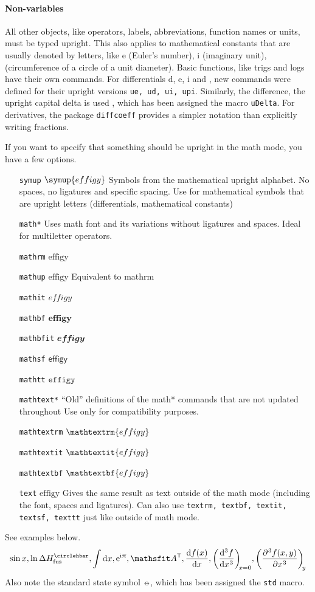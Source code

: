 \documentclass{article}
\begin{document}
\paragraph{Non-variables} All other objects, like operators, labels, abbreviations, function names or units, must be typed upright. This also applies to mathematical constants that are usually denoted by letters, like e (Euler's number), i (imaginary unit), \upi (circumference of a circle of a unit diameter). Basic functions, like trigs and logs have their own commands. For differentials d, e, i and \upi, new commands were defined for their upright versions \texttt{ue, ud, ui, upi}. Similarly, the difference, the upright capital delta is used \uDelta, which has been assigned the macro \texttt{uDelta}. For derivatives, the package \texttt{diffcoeff} provides a simpler notation than explicitly writing fractions.

If you want to specify that something should be upright in the math mode, you have a few options.
\begin{itemize}[leftmargin=10em]
    \item[\texttt{symup} \(\symup{effigy}\)] Symbols from the mathematical upright alphabet. No spaces, no ligatures and specific spacing. Use for mathematical symbols that are upright letters (differentials, mathematical constants)
    \item[\texttt{math*}] Uses math font and its variations without ligatures and spaces. Ideal for multiletter operators.
    \item[\texttt{mathrm} \(\mathrm{effigy}\)]
    \item[\texttt{mathup} \(\mathup{effigy}\)] Equivalent to mathrm
    \item[\texttt{mathit} \(\mathit{effigy}\)]
    \item[\texttt{mathbf} \(\mathbf{effigy}\)]
    \item[\texttt{mathbfit} \(\mathbfit{effigy}\)]
    \item[\texttt{mathsf} \(\mathsf{effigy}\)]
    \item[\texttt{mathtt} \(\mathtt{effigy}\)]
    \item[\texttt{mathtext*}] ``Old'' definitions of the math* commands that are not updated throughout  Use only for compatibility purposes.
    \item[\texttt{mathtextrm} \(\mathtextrm{effigy}\)]
    \item[\texttt{mathtextit} \(\mathtextit{effigy}\)]
    \item[\texttt{mathtextbf} \(\mathtextbf{effigy}\)]
    \item[\texttt{text} \(\text{effigy}\)] Gives the same result as text outside of the math mode (including the font, spaces and ligatures). Can also use \texttt{textrm, textbf, textit, textsf, texttt} just like outside of math mode.
\end{itemize}
See examples below.
\[
\sin x, \ln \uDelta H_\textrm{fus}^\std,\int \ud x, \ue^{\ui \upi}, \mat{A}^\transp, \diff{f(x)}{x}, \diff[3]{f}{x}[x=0], \diffp[3]{f(x,y)}{x}[y]
\]
Also note the standard state symbol $\circlehbar$, which has been assigned the \texttt{std} macro.
\end{document}

